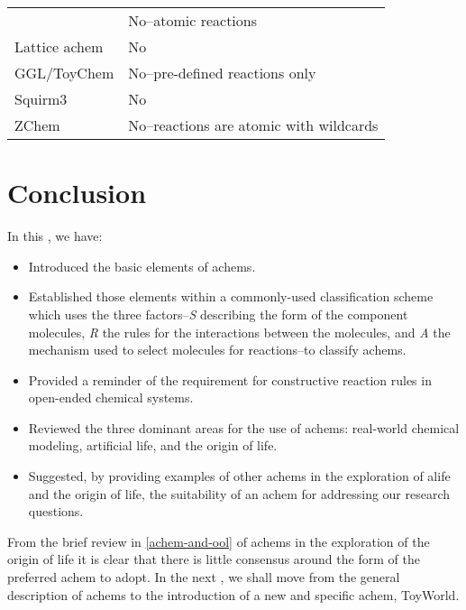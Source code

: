 \begin{table}
\begin{center}
\begin{tabular}{@{}p{7.5cm}p{6cm}@{}}
		\textcite{Gardiner2007}                                                & No--atomic reactions                    \\
		Lattice \gls{achem} \parencite{Ono2000,Madina2003}        		   & No                                       \\
		GGL/ToyChem \parencite{Benko2003}                                  & No--pre-defined reactions only          \\
		Squirm3 \parencite{Hutton2002,Lucht2012}                           & No                                       \\
		ZChem \parencite{Tominaga2004}                                     & No--reactions are atomic with wildcards \\
		\bottomrule
	\end{tabular}
	\end{center}
\end{table}

\section{Conclusion}

In this , we have:

\begin{itemize}
	\item Introduced the basic elements of \glspl{achem}.
	\item Established those elements within a commonly-used classification scheme \parencite{Dittrich:2001zr} which uses the three factors--\emph{S} describing the form of the component molecules, \emph{R} the rules for the interactions between the molecules, and \emph{A} the mechanism used to select molecules for reactions--to classify \glspl{achem}.
	\item Provided a reminder of the requirement for constructive reaction rules in open-ended chemical systems.
	\item Reviewed the three dominant areas for the use of \glspl{achem}: real-world chemical modeling, artificial life, and the origin of life.
	\item Suggested, by providing examples of other \glspl{achem} in the exploration of \gls{alife} and the origin of life, the suitability of an \gls{achem} for addressing our research questions.
\end{itemize}

From the brief review in \cref{achem-and-ool} of \glspl{achem} in the exploration of the origin of life it is clear that there is little consensus around the form of the preferred \gls{achem} to adopt. In the next , we shall move from the general description of \glspl{achem} to the introduction of a new and specific \gls{achem}, ToyWorld.